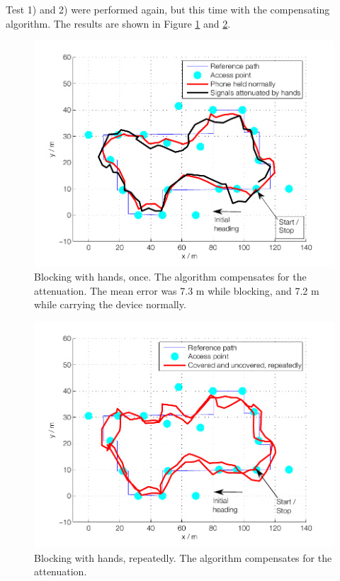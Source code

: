 \documentclass{LTHthesis}
\begin{document}
Test 1) and 2) were performed again, but this time with the compensating algorithm. The results are shown in Figure \ref{hand_block_comp} and \ref{hand_block_repeatedly_comp}.

\begin{figure}[!htb]

\includegraphics[width=1\textwidth ]{images/adapt_parameters/hand_block_comp}
\caption{Blocking with hands, once. The algorithm compensates for the attenuation. The mean error was 7.3 m while blocking, and 7.2 m while carrying the device normally.}\label{hand_block_comp}
\end{figure}

\begin{figure}[!htb]

\includegraphics[width=1\textwidth ]{images/adapt_parameters/hand_block_repeatedly_comp}
\caption{Blocking with hands, repeatedly. The algorithm compensates for the attenuation.}\label{hand_block_repeatedly_comp}
\end{figure}
\end{document}

